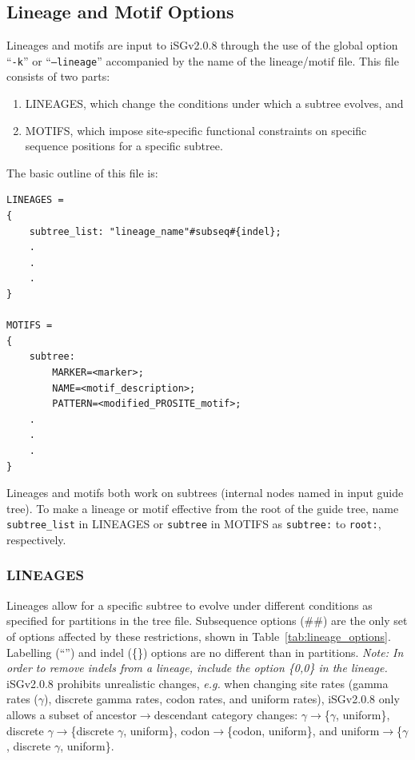 \documentclass[10pt]{article}
\newcommand{\version}{2.0.8 }
\newcommand{\iSGcurrentshort}{iSGv\version }
\begin{document}
 \subsection{Lineage and Motif Options}
 \label{sec:lineage}
 \label{sec:lineage_options}
 \label{sec:motif_options}
 Lineages and motifs are input to \iSGcurrentshort through the use of the global option ``{\tt -k}'' or ``{\tt --lineage}'' accompanied by the name of the lineage/motif file. This file consists of two parts: 
  \begin{enumerate} 
   \item LINEAGES, which change the conditions under which a subtree evolves, and 
   \item MOTIFS, which impose site-specific functional constraints on specific sequence positions for a specific subtree. 
  \end{enumerate}
 
The basic outline of this file is:
\begin{verbatim}
LINEAGES =
{
    subtree_list: "lineage_name"#subseq#{indel};
    .
    .
    .
}

MOTIFS =
{
    subtree:
        MARKER=<marker>;
        NAME=<motif_description>;
        PATTERN=<modified_PROSITE_motif>;
    .
    .
    .
}
\end{verbatim}

Lineages and motifs both work on subtrees (internal nodes named in input guide tree). To make a lineage or motif effective from the root of the guide tree, name {\tt subtree\_list} in LINEAGES or {\tt subtree} in MOTIFS as {\tt subtree:} to {\tt root:}, respectively. 


 \subsubsection{LINEAGES}
 Lineages allow for a specific subtree to evolve under different conditions as specified for partitions in the tree file.  Subsequence options (\#\#) are the only set of options affected by these restrictions, shown in Table~\ref{tab:lineage_options}. Labelling (``'') and indel (\{\}) options are no different than in partitions. {\it Note: In order to remove indels from a lineage, include the option \{0,0\} in the lineage.} 
 \iSGcurrentshort prohibits unrealistic changes, {\it e.g.} when changing site rates (gamma rates ($\gamma$), discrete gamma rates, codon rates, and uniform rates), \iSGcurrentshort only allows a subset of ancestor$\rightarrow$descendant category changes: $\gamma\rightarrow$\{$\gamma$, uniform\}, discrete $\gamma\rightarrow$\{discrete $\gamma$, uniform\}, codon$\rightarrow$\{codon, uniform\}, and uniform$\rightarrow$\{$\gamma$, discrete $\gamma$, uniform\}.
 
\end{document}
